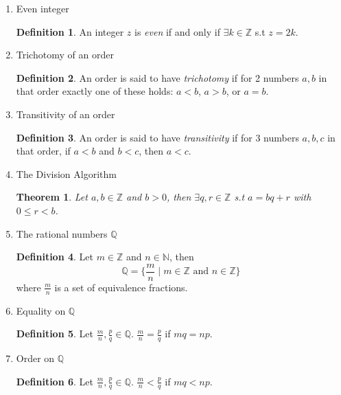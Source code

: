 \documentclass{article}
\theoremstyle{claim}
\newtheorem{theorem}{Theorem}[section]
\theoremstyle{definition}
\newtheorem{definition}{Definition}
\begin{document}
\begin{enumerate}
    \item[6.] Even integer
        \begin{definition}
            An integer $z$ is \emph{even} if and only if $\exists k \in \mathbb{Z}$ s.t $z = 2k$.
        \end{definition}

    \item[7.] Trichotomy of an order
        \begin{definition}
            An order is said to have \emph{trichotomy} if for 2 numbers $a, b$ in that order exactly one of these holds: $a < b$, $a > b$, or $a = b$.
        \end{definition}
    
    \item[8.] Transitivity of an order
        \begin{definition}
            An order is said to have \emph{transitivity} if for 3 numbers $a, b, c$ in that order, if $a < b$ and $b < c$, then $a < c$.
        \end{definition}

    \item[9.] The Division Algorithm
        \begin{theorem}
            Let $a, b \in \mathbb{Z}$ and $b > 0$, then $\exists q, r \in \mathbb{Z}$ s.t $a = bq + r$ with $0 \le r < b$.
        \end{theorem}
    \item[10.] The rational numbers $\mathbb{Q}$
        \begin{definition}
            Let $m \in \mathbb{Z}$ and $n \in \mathbb{N}$, then
            \begin{equation*}
                \mathbb{Q} = \{ \frac{m}{n} \mid m \in \mathbb{Z} \text{ and } n \in \mathbb{Z} \}
            \end{equation*}
            where $\frac{m}{n}$ is a set of equivalence fractions.
        \end{definition}

    \item[11.] Equality on $\mathbb{Q}$
        \begin{definition}
            Let $\frac{m}{n}, \frac{p}{q} \in \mathbb{Q}$. $\frac{m}{n} = \frac{p}{q}$ if $mq = np$.
        \end{definition}
    
    \item[12.] Order on $\mathbb{Q}$
        \begin{definition}
            Let $\frac{m}{n}, \frac{p}{q} \in \mathbb{Q}$. $\frac{m}{n} < \frac{p}{q}$ if $mq < np$.
        \end{definition}
        

\end{enumerate}
\end{document}
